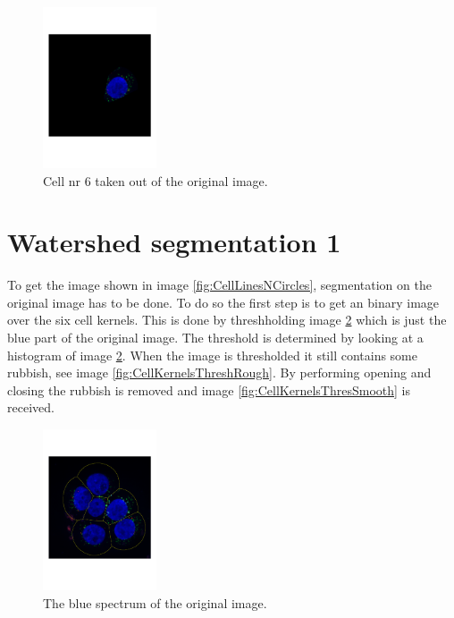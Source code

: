 \documentclass[10pt,twocolumn]{article}
\begin{document}
\begin{figure}[ht]
\centering
\includegraphics[width=0.3\textwidth]{Bilder/CellPart.pdf}
\caption{Cell nr 6 taken out of the original image.}
\label{fig:CellPart}
\end{figure}


%
%

\section{Watershed segmentation 1} \label{sec:WatSeg1}
To get the image shown in image \ref{fig:CellLinesNCircles}, segmentation
on the original image has to be done. To do so the first step is to get an binary image over the
six cell kernels. This is done by threshholding image \ref{fig:ImColourBlue} which is
just the blue part of the original image. The threshold is determined by looking at
a histogram of image \ref{fig:ImColourBlue}. When the image is thresholded it still
contains some rubbish, see image \ref{fig:CellKernelsThreshRough}. By performing
opening and closing the rubbish is removed and image \ref{fig:CellKernelsThresSmooth} is received.

\begin{figure}[ht]
\centering
\includegraphics[width=0.3\textwidth]{Bilder/CellLinesNCircles.pdf}
\caption{The blue spectrum of the original image.}
\label{fig:ImColourBlue}
\end{figure}
\end{document}
